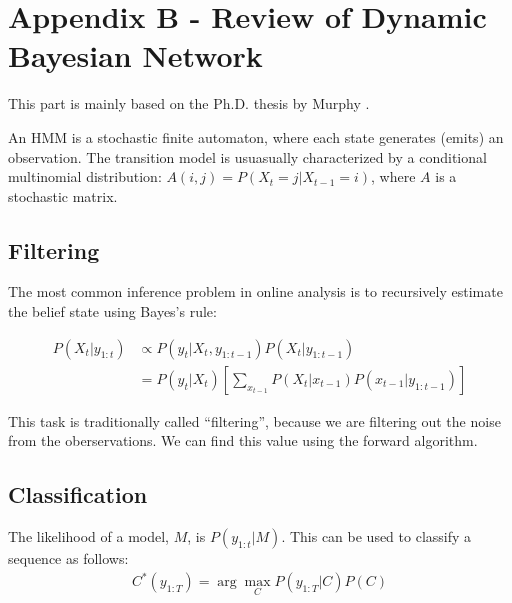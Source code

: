 \section{Appendix B - Review of Dynamic Bayesian Network}
This part is mainly based on the Ph.D. thesis by Murphy \cite{murphy02}.

An HMM is a stochastic finite automaton, where each state generates (emits) an
observation. The transition model is usuasually characterized by a conditional
multinomial distribution: $A(i, j) = P(X_t = j | X_{t-1} = i)$, where $A$ is a
stochastic matrix.

\subsection{Filtering}
The most common inference problem in online analysis is to recursively estimate
the belief state using Bayes's rule:

\begin{align*}
P(X_t | y_{1:t}) & \propto P(y_t | X_t, y_{1:t-1})P(X_t | y_{1:t-1}) \\
 				 & = P(y_t | X_t) \left[\sum_{x_{t - 1}} 
				 	 P(X_t | x_{t - 1})P(x_{t - 1} | y_{1:t - 1})\right]	
\end{align*}

This task is traditionally called ``filtering'', because we are filtering out
the noise from the oberservations. We can find this value using the forward
algorithm.

\subsection{Classification}
The likelihood of a model, $M$, is $P(y_{1:t}|M)$. This can be used to classify
a sequence as follows:
\begin{align*}
C^*(y_{1:T}) = \arg \max_{C} P(y_{1:T} | C)P(C)
\end{align*}

